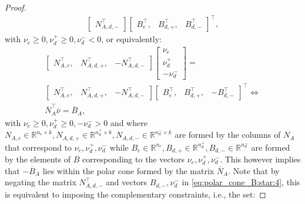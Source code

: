 \documentclass[letterpaper, 10 pt, conference]{ieeeconf}  %
\begin{document}
\begin{proof}
\begin{equation}
\begin{gathered}
\begin{bmatrix}
             N_{A,d,-}^\top 
         \end{bmatrix}
          \begin{bmatrix}
             B_{e}^\top, & 
             B_{d,+}^\top,  &
             B_{d,-}^\top 
         \end{bmatrix}^\top,
\end{gathered}
\end{equation}
with $\nu_e \geq 0, \nu_d^+ \geq 0, \nu_d^- < 0$, or equivalently:
\begin{equation}\label{eq:polar_cone_B:star:4}
    \begin{gathered}
        \begin{bmatrix}
             N_{A,e}^\top, & 
             N_{A,d,+}^\top,  &
             -N_{A,d,-}^\top 
         \end{bmatrix}
         \begin{bmatrix}
            \nu_e \\ 
            \nu_d^+ \\
            -\nu_d^-
         \end{bmatrix} = \\
         \begin{bmatrix}
             N_{A,e}^\top, & 
             N_{A,d,+}^\top,  &
             -N_{A,d,-}^\top 
         \end{bmatrix}
          \begin{bmatrix}
             B_{e}^\top, & 
             B_{d,+}^\top,  &
             -B_{d,-}^\top 
         \end{bmatrix}^\top 
          \Leftrightarrow \\
         \overline{N}_A^\top \bar{\nu} = \overline{B}_A,
    \end{gathered}
\end{equation}
with $\nu_e \geq 0, \nu_d^+ \geq 0, -\nu_d^- > 0$ and where $N_{A,e} \in \mathbb{R}^{n_e \times k}, N_{A,d,+} \in \mathbb{R}^{n_d^+ \times k}, N_{A,d,-}  \in \mathbb{R}^{n_d^- \times k}$ are formed by the columns of ${N}_A$ that correspond to $\nu_e, \nu_d^+, \nu_d^- $ while  $B_{e}  \in \mathbb{R}^{n_e}, B_{d,+}\in \mathbb{R}^{n_d^+}, B_{d,-}\in \mathbb{R}^{n_d^-}$ are formed by the elements of $B$ corresponding to the vectors $\nu_e, \nu_d^+, \nu_d^- $. This however implies that $-\overline{B}_A$ lies within the polar cone formed by the matrix $\overline{N}_A$. Note that by negating the matrix $N_{A,d,-}^\top $ and vectors $B_{d,-}, \nu_d^-$ in \eqref{eq:polar_cone_B:star:4}, this is equivalent to imposing the complementary constraints, i.e., the set:

\end{proof}
\end{document}
